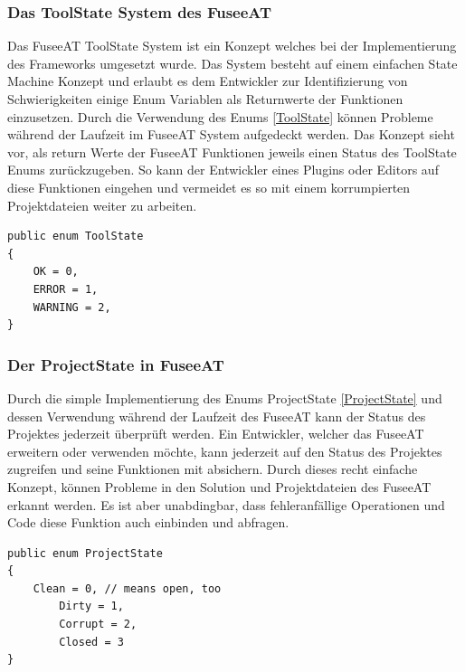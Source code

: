 \documentclass[pagesize, paper=a4, fontsize=12pt, titlepage=true, headings=small, headnosepline, abstractoff, liststotoc, nochapterprefix, plainheadsepline, twoside]{scrreprt}
\begin{document}
\subsubsection{Das ToolState System des FuseeAT}
Das FuseeAT ToolState System ist ein Konzept welches bei der Implementierung des Frameworks umgesetzt wurde. Das System besteht auf einem einfachen State Machine Konzept und erlaubt es dem Entwickler zur Identifizierung von Schwierigkeiten einige Enum Variablen als Returnwerte der Funktionen einzusetzen. Durch die Verwendung des Enums \ref{ToolState} können Probleme während der Laufzeit im FuseeAT System aufgedeckt werden. Das Konzept sieht vor, als return Werte der FuseeAT Funktionen jeweils einen Status des ToolState Enums zurückzugeben. So kann der Entwickler eines Plugins oder Editors auf diese Funktionen eingehen und vermeidet es so mit einem korrumpierten Projektdateien weiter zu arbeiten.
\begin{lstlisting}[label=ToolState, caption=ToolState System: Unterstützt die Stabilität des FuseeAT bei der Zusammenarbeit mit Plugins.]
public enum ToolState
{
	OK = 0,
	ERROR = 1,
	WARNING = 2,
}
\end{lstlisting}

\subsubsection{Der ProjectState in FuseeAT}
Durch die simple Implementierung des Enums ProjectState \ref{ProjectState} und dessen Verwendung während der Laufzeit des FuseeAT kann der Status des Projektes jederzeit überprüft werden. Ein Entwickler, welcher das FuseeAT erweitern oder verwenden möchte, kann jederzeit auf den Status des Projektes zugreifen und seine Funktionen mit absichern. Durch dieses recht einfache Konzept, können Probleme in den Solution und Projektdateien des FuseeAT erkannt werden. Es ist aber unabdingbar, dass fehleranfällige Operationen und Code diese Funktion auch einbinden und abfragen.
\begin{lstlisting}[caption=Code des ProjectState Enums. Wird in FuseeAT verwendet um die Integrität eines Projekts zu repräsentieren., label=ProjectState]
public enum ProjectState
{
	Clean = 0, // means open, too
        Dirty = 1,
        Corrupt = 2,
        Closed = 3
}
\end{lstlisting}
\end{document}

